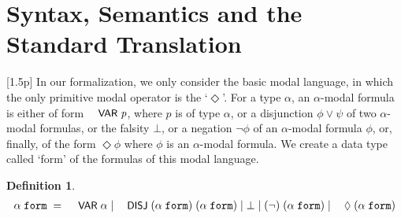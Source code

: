 \documentclass{llncs}
\newtheorem{defn}{Definition}[chapter]
\newenvironment{holmath}{\begin{displaymath}\begin{array}{l}}{\end{array}\end{displaymath}\ignorespacesafterend}
\renewcommand{\HOLConst}[1]{{\textsf{\upshape\small #1}}}
\renewcommand{\HOLinline}[1]{\ensuremath{#1}}
\renewcommand{\HOLTokenBar}{\mbox{$|$}}
\begin{document}
\section{Syntax, Semantics and the Standard Translation}[1.5p]
In our formalization, we only consider the basic modal language, in which the only primitive modal operator is the `$\Diamond$'. For a type $\alpha$, an $\alpha$-modal formula is either of form \HOLinline{\HOLConst{VAR}\;\HOLFreeVar{p}}, where $p$ is of type $\alpha$, or a disjunction $\phi\lor \psi$ of two $\alpha$-modal formulas, or the falsity $\bot$, or a negation $\lnot \phi$ of an $\alpha$-modal formula $\phi$, or, finally, of the form $\Diamond \phi$ where $\phi$ is an $\alpha$-modal formula. We create a data type called `form' of the formulas of this modal language. 
\begin{defn}
{\upshape\cite[Definition 1.9]{Blackburn}}
\begin{holmath}
  \ensuremath{\alpha}\;\HOLTyOp{form}\;=\;\HOLConst{VAR}\;\ensuremath{\alpha}\;\HOLTokenBar{}\;\HOLConst{DISJ}\;(\ensuremath{\alpha}\;\HOLTyOp{form})\;(\ensuremath{\alpha}\;\HOLTyOp{form})\;\HOLTokenBar{}\;\HOLSymConst{\ensuremath{\bot}}\;\HOLTokenBar{}\;(\HOLSymConst{\HOLTokenNeg{}})\;(\ensuremath{\alpha}\;\HOLTyOp{form})\;\HOLTokenBar{}\;\HOLConst{\ensuremath{\Diamond}}\;(\ensuremath{\alpha}\;\HOLTyOp{form})
\end{holmath}
\end{defn}
\end{document}
